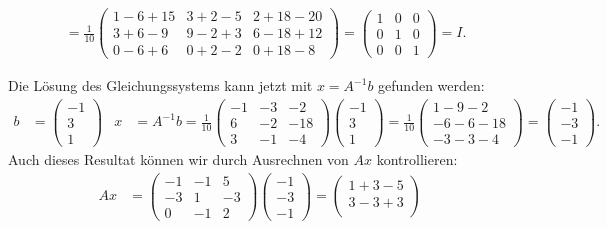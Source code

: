 \begin{loesung}
\begin{teilaufgaben}
\begin{align*}
{}
\\
&=
\frac1{10}
\begin{pmatrix}
1-6+15 & 3+2-5 & 2 +18 - 20\\
3+6-9  & 9 -2+3& 6-18+12\\
0-6+6  & 0+2-2&0+18-8
\end{pmatrix}
=\begin{pmatrix}
1&0&0\\
0&1&0\\
0&0&1
\end{pmatrix}=I.
\end{align*}
\item Die Lösung des Gleichungssystems kann jetzt mit $x=A^{-1}b$ gefunden
werden:
\begin{align*}
b&=
\begin{pmatrix}-1\\3\\1\end{pmatrix}
&
x&=A^{-1}b=
\frac1{10}
\begin{pmatrix}
-1&-3& -2\\
 6&-2&-18\\
 3&-1& -4
\end{pmatrix}
\begin{pmatrix}-1\\ 3\\ 1\end{pmatrix}
=
\frac1{10}
\begin{pmatrix}
 1-9-2\\
-6-6-18\\
-3-3-4
\end{pmatrix}
=
\begin{pmatrix}
-1\\
-3\\
-1
\end{pmatrix}.
\end{align*}
Auch dieses Resultat können wir durch Ausrechnen von $Ax$ kontrollieren:
\begin{align*}
Ax
&=
\begin{pmatrix}
  -1& -1&  5\\
  -3&  1& -3\\
   0& -1&  2
\end{pmatrix}
\begin{pmatrix}
-1\\-3\\-1
\end{pmatrix}
=
\begin{pmatrix}
1+3-5\\
3-3+3\\

\end{pmatrix}
\end{align*}
\end{teilaufgaben}
\end{loesung}
